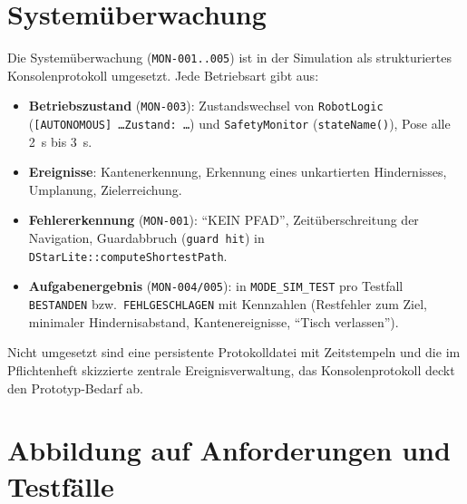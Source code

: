 \documentclass[
  a4paper,
  12pt,
  DIV=12,        %
  parskip=half,  %
  headings=small %
]{scrartcl}
\theoremstyle{definition}
\providecommand{\tightlist}{%
  \setlength{\itemsep}{0pt}\setlength{\parskip}{0pt}}
\theoremstyle{definition}
\begin{document}
\section{Systemüberwachung}\label{systemueberwachung}

Die Systemüberwachung (\texttt{MON-001..005}) ist in der Simulation als
strukturiertes Konsolenprotokoll umgesetzt. Jede Betriebsart gibt aus:

\begin{itemize}
\tightlist
\item
  \textbf{Betriebszustand} (\texttt{MON-003}): Zustandswechsel von
  \texttt{RobotLogic} (\texttt{[AUTONOMOUS] \ldots Zustand: \ldots}) und
  \texttt{SafetyMonitor} (\texttt{stateName()}), Pose alle
  \SI{2}{\second} bis \SI{3}{\second}.
\item
  \textbf{Ereignisse}: Kantenerkennung, Erkennung eines unkartierten
  Hindernisses, Umplanung, Zielerreichung.
\item
  \textbf{Fehlererkennung} (\texttt{MON-001}): \enquote{KEIN PFAD},
  Zeitüberschreitung der Navigation, Guardabbruch (\texttt{guard hit})
  in \texttt{DStarLite::computeShortestPath}.
\item
  \textbf{Aufgabenergebnis} (\texttt{MON-004/005}): in
  \texttt{MODE\_SIM\_TEST} pro Testfall \texttt{BESTANDEN} bzw.\
  \texttt{FEHLGESCHLAGEN} mit Kennzahlen (Restfehler zum Ziel, minimaler
  Hindernisabstand, Kantenereignisse, \enquote{Tisch verlassen}).
\end{itemize}

Nicht umgesetzt sind eine persistente Protokolldatei mit Zeitstempeln
und die im Pflichtenheft skizzierte zentrale Ereignisverwaltung, das
Konsolenprotokoll deckt den Prototyp-Bedarf ab.

\section{Abbildung auf Anforderungen und Testfälle}\label{traceability}
\end{document}
